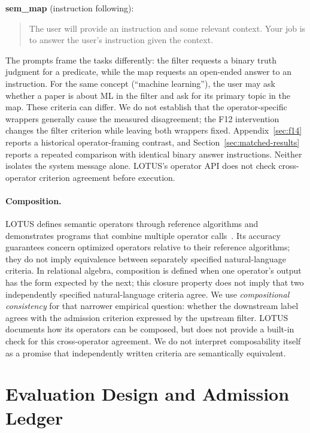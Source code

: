 \documentclass[11pt]{article}
\begin{document}
\noindent\textbf{sem\_map} (instruction following):
\begin{quote}\small\ttfamily\raggedright
The user will provide an instruction and some relevant context.
Your job is to answer the user's instruction given the context.
\end{quote}

\smallskip
\noindent
The prompts frame the tasks differently: the filter requests a binary
truth judgment for a predicate, while the map requests an open-ended answer
to an instruction. For the same concept (``machine learning''), the user may
ask whether a paper is about ML in the filter and ask for its primary topic
in the map. These criteria can differ. We do not establish that the
operator-specific wrappers generally cause the measured disagreement; the F12
intervention changes the filter criterion while leaving both wrappers fixed.
Appendix~\ref{sec:f14} reports a historical operator-framing contrast, and
Section~\ref{sec:matched-results} reports a repeated comparison with identical
binary answer instructions. Neither isolates the system message alone.
LOTUS's operator API does not check cross-operator criterion agreement before
execution.

\paragraph{Composition.}
LOTUS defines semantic operators through reference algorithms and
demonstrates programs that combine multiple operator calls~\cite{lotus}.
Its accuracy guarantees concern optimized operators relative to their
reference algorithms; they do not imply equivalence between separately
specified natural-language criteria.
In relational algebra, composition is defined when one operator's output has
the form expected by the next; this closure property does not imply that two
independently specified natural-language criteria agree.  We use
\emph{compositional consistency} for that narrower empirical question: whether
the downstream label agrees with the admission criterion expressed by the
upstream filter.  LOTUS documents how its operators can be composed, but does
not provide a built-in check for this cross-operator agreement.  We do not
interpret composability itself as a promise that independently written
criteria are semantically equivalent.


\section{Evaluation Design and Admission Ledger}
\label{sec:design}
\end{document}
